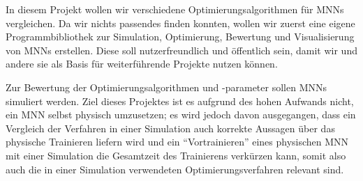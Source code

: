 In diesem Projekt wollen wir verschiedene Optimierungsalgorithmen für MNNs vergleichen.
Da wir nichts passendes finden konnten, wollen wir zuerst eine eigene Programmbibliothek zur Simulation, Optimierung, Bewertung und Visualisierung von MNNs erstellen.
Diese soll nutzerfreundlich und öffentlich sein, damit wir und andere sie als Basis für weiterführende Projekte nutzen können.

Zur Bewertung der Optimierungsalgorithmen und -parameter sollen MNNs simuliert werden.
Ziel dieses Projektes ist es aufgrund des hohen Aufwands nicht, ein MNN selbst physisch umzusetzen;
es wird jedoch davon ausgegangen, dass ein Vergleich der Verfahren in einer Simulation auch korrekte Aussagen über das physische Trainieren liefern wird und ein \enquote{Vortrainieren} eines physischen MNN mit einer Simulation die Gesamtzeit des Trainierens verkürzen kann, somit also auch die in einer Simulation verwendeten Optimierungsverfahren relevant sind.

